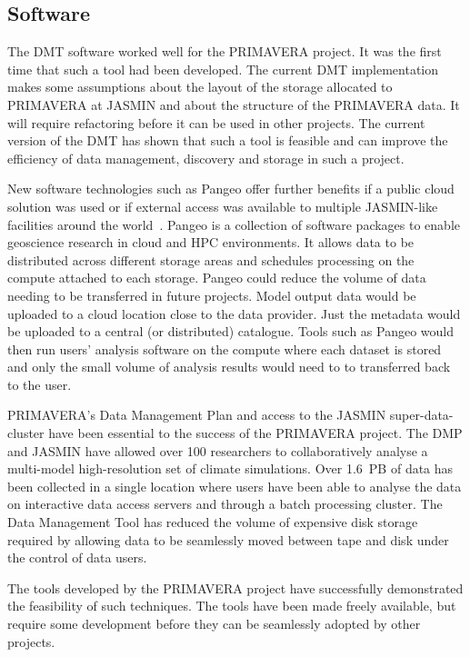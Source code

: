 \documentclass[gmd, manuscript]{copernicus}
\begin{document}
\subsection{Software}

The DMT software worked well for the PRIMAVERA project. It was the first time that such a tool had been developed. The current DMT implementation makes some assumptions about the layout of the storage allocated to PRIMAVERA at JASMIN and about the structure of the PRIMAVERA data. It will require refactoring before it can be used in other projects. The current version of the DMT has shown that such a tool is feasible and can improve the efficiency of data management, discovery and storage in such a project.

New software technologies such as Pangeo offer further benefits if a public cloud solution was used or if external access was available to multiple JASMIN-like facilities around the world~\citep{Pangeo}. Pangeo is a collection of software packages to enable geoscience research in cloud and HPC environments. It allows data to be distributed across different storage areas and schedules processing on the compute attached to each storage. Pangeo could reduce the volume of data needing to be transferred in future projects. Model output data would be uploaded to a cloud location close to the data provider. Just the metadata would be uploaded to a central (or distributed) catalogue. Tools such as Pangeo would then run users' analysis software on the compute where each dataset is stored and only the small volume of analysis results would need to to transferred back to the user.

\conclusions  %

PRIMAVERA's Data Management Plan and access to the JASMIN super-data-cluster have been essential to the success of the PRIMAVERA project. The DMP and JASMIN have allowed over 100 researchers to collaboratively analyse a multi-model high-resolution set of climate simulations. Over 1.6~PB of data has been collected in a single location where users have been able to analyse the data on interactive data access servers and through a batch processing cluster. The Data Management Tool has reduced the volume of expensive disk storage required by allowing data to be seamlessly moved between tape and disk under the control of data users.

The tools developed by the PRIMAVERA project have successfully demonstrated the feasibility of such techniques. The tools have been made freely available, but require some development before they can be seamlessly adopted by other projects.
\end{document}
